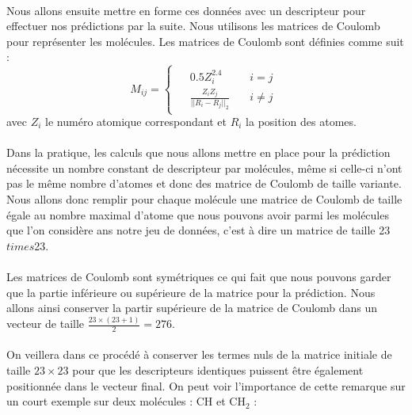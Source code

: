 \documentclass[a4paper,12pt,titlepage]{report}
\begin{document}
\paragraph{}
Nous allons ensuite mettre en forme ces données avec un descripteur pour effectuer nos prédictions par la suite. Nous utilisons les matrices de Coulomb pour représenter les molécules.
Les matrices de Coulomb sont définies comme suit : 
\[
M_{ij} = 
	\left\{
	\begin{array}{ccc}		
	\begin{aligned}
		& 0.5 Z_{i}^{2.4} \quad &i=j\\
		& \frac{Z_i Z_j}{||R_i - R_j||_{2}} \quad &i\neq j
	\end{aligned}
\end{array}
	\right.
\]
avec $Z_i$ le numéro atomique correspondant et $R_i$ la position des atomes.\\


\paragraph{}
Dans la pratique, les calculs que nous allons mettre en place pour la prédiction nécessite un nombre constant de descripteur par molécules, même si celle-ci n'ont pas le même nombre d'atomes et donc des matrice de Coulomb de taille variante.
Nous allons donc remplir pour chaque molécule une matrice de Coulomb de taille égale au nombre maximal d'atome que nous pouvons avoir parmi les molécules que l'on considère ans notre jeu de données, c'est à dire un matrice de taille 23$times$23.

\paragraph{}
Les matrices de Coulomb sont symétriques ce qui fait que nous pouvons garder que la partie inférieure ou supérieure de la matrice pour la prédiction. Nous allons ainsi conserver la partir supérieure de la matrice de Coulomb dans un vecteur de taille $\frac{23\times(23+1)}{2} = 276$.

\paragraph{}
On veillera dans ce procédé à conserver les termes nuls de la matrice initiale de taille $23\times23$ pour que les descripteurs identiques puissent être également positionnée dans le vecteur final. On peut voir l'importance de cette remarque sur  un court exemple sur deux molécules : CH et CH$_2$ :
\end{document}

